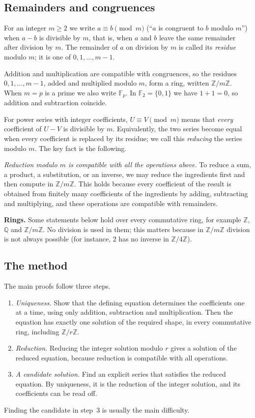 \documentclass[11pt,a4paper]{article}
\theoremstyle{definition}
\theoremstyle{remark}
\newcommand{\Z}{\mathbb{Z}}
\newcommand{\Q}{\mathbb{Q}}
\newcommand{\F}{\mathbb{F}}
\newcommand{\para}[1]{\par\medskip\noindent\textbf{#1}\enspace}
\begin{document}
\subsection{Remainders and congruences}
For an integer $m\ge2$ we write $a\equiv b\pmod m$ (``$a$ is congruent to $b$ modulo $m$'') when $a-b$ is divisible by
$m$, that is, when $a$ and $b$ leave the same remainder after division by $m$. The remainder of $a$ on division by
$m$ is called its \emph{residue} modulo $m$; it is one of $0,1,\dots,m-1$.

Addition and multiplication are compatible with congruences, so the residues $0,1,\dots,m-1$, added and multiplied
modulo $m$, form a ring, written $\Z/m\Z$. When $m=p$ is a prime we also write $\F_p$. In $\F_2=\{0,1\}$ we have $1+1=0$,
so addition and subtraction coincide.

For power series with integer coefficients, $U\equiv V\pmod m$ means that \emph{every} coefficient of $U-V$ is
divisible by $m$. Equivalently, the two series become equal when every coefficient is replaced by its residue; we call
this \emph{reducing} the series modulo $m$. The key fact is the following.

\emph{Reduction modulo $m$ is compatible with all the operations above.} To reduce a sum, a product, a substitution, or
an inverse, we may reduce the ingredients first and then compute in $\Z/m\Z$. This holds because every
coefficient of the result is obtained from finitely many coefficients of the ingredients by adding, subtracting and
multiplying, and these operations are compatible with remainders.

\para{Rings.} Some statements below hold over every commutative ring, for example $\Z$, $\Q$ and $\Z/m\Z$. No
division is used in them; this matters because in $\Z/m\Z$ division is not always possible (for instance, $2$ has no inverse in
$\Z/4\Z$).

\subsection{The method}
The main proofs follow three steps.
\begin{enumerate}
\item \emph{Uniqueness.} Show that the defining equation determines the coefficients one at a time, using only
addition, subtraction and multiplication. Then the equation has exactly one solution of the required shape, in every
commutative ring, including $\Z/r\Z$.
\item \emph{Reduction.} Reducing the integer solution modulo $r$ gives a solution of the reduced equation,
because reduction is compatible with all operations.
\item \emph{A candidate solution.} Find an explicit series that satisfies the reduced equation. By uniqueness, it is
the reduction of the integer solution, and its coefficients can be read off.
\end{enumerate}
Finding the candidate in step~3 is usually the main difficulty.
\end{document}
